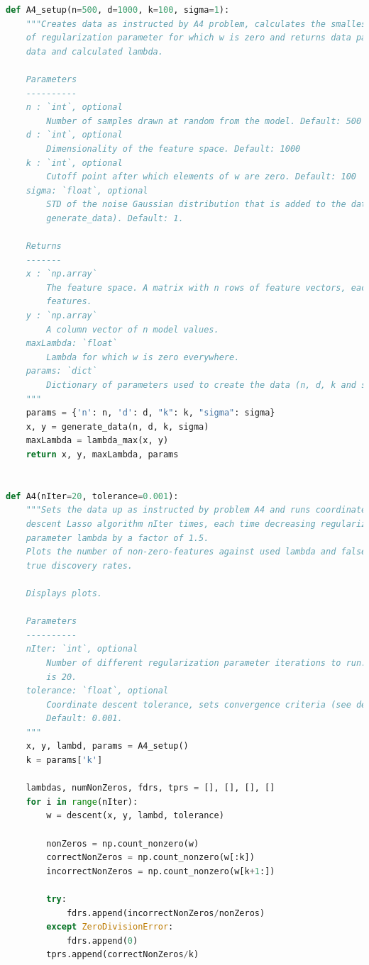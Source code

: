 \documentclass{article}
\newcommand{\1}{\mathbf{1}}
\begin{document}
\begin{enumerate}
\begin{lstlisting}[language=Python]
def A4_setup(n=500, d=1000, k=100, sigma=1):
    """Creates data as instructed by A4 problem, calculates the smallest value
    of regularization parameter for which w is zero and returns data parameters,
    data and calculated lambda.

    Parameters
    ----------
    n : `int`, optional
        Number of samples drawn at random from the model. Default: 500
    d : `int`, optional
        Dimensionality of the feature space. Default: 1000
    k : `int`, optional
        Cutoff point after which elements of w are zero. Default: 100
    sigma: `float`, optional
        STD of the noise Gaussian distribution that is added to the data (see
        generate_data). Default: 1.

    Returns
    -------
    x : `np.array`
        The feature space. A matrix with n rows of feature vectors, each with d
        features.
    y : `np.array`
        A column vector of n model values.
    maxLambda: `float`
        Lambda for which w is zero everywhere.
    params: `dict`
        Dictionary of parameters used to create the data (n, d, k and sigma).
    """
    params = {'n': n, 'd': d, "k": k, "sigma": sigma}
    x, y = generate_data(n, d, k, sigma)
    maxLambda = lambda_max(x, y)
    return x, y, maxLambda, params


def A4(nIter=20, tolerance=0.001):
    """Sets the data up as instructed by problem A4 and runs coordinate
    descent Lasso algorithm nIter times, each time decreasing regularization
    parameter lambda by a factor of 1.5.
    Plots the number of non-zero-features against used lambda and false vs
    true discovery rates.

    Displays plots.

    Parameters
    ----------
    nIter: `int`, optional
        Number of different regularization parameter iterations to run. Default
        is 20.
    tolerance: `float`, optional
        Coordinate descent tolerance, sets convergence criteria (see descent).
        Default: 0.001.
    """
    x, y, lambd, params = A4_setup()
    k = params['k']

    lambdas, numNonZeros, fdrs, tprs = [], [], [], []
    for i in range(nIter):
        w = descent(x, y, lambd, tolerance)

        nonZeros = np.count_nonzero(w)
        correctNonZeros = np.count_nonzero(w[:k])
        incorrectNonZeros = np.count_nonzero(w[k+1:])

        try:
            fdrs.append(incorrectNonZeros/nonZeros)
        except ZeroDivisionError:
            fdrs.append(0)
        tprs.append(correctNonZeros/k)


\end{lstlisting}
\end{enumerate}
\end{document}
